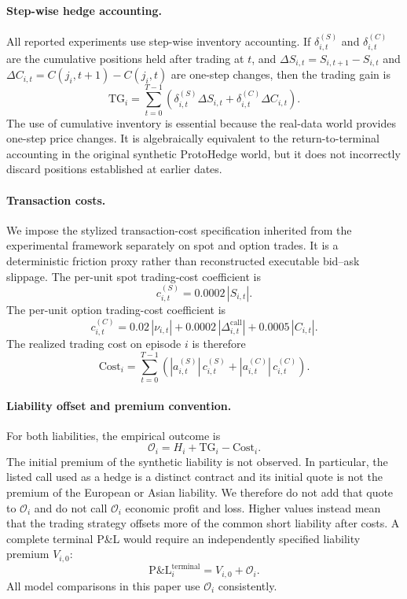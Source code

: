 \documentclass[sigconf]{acmart}
\begin{document}
\paragraph{Step-wise hedge accounting.}
All reported experiments use step-wise inventory accounting. If
$\delta_{i,t}^{(S)}$ and $\delta_{i,t}^{(C)}$ are the cumulative positions
held after trading at $t$, and $\Delta S_{i,t}=S_{i,t+1}-S_{i,t}$ and
$\Delta C_{i,t}=C(j_i,t+1)-C(j_i,t)$ are one-step changes, then the trading
gain is
\[
\mathrm{TG}_i
=
\sum_{t=0}^{T-1}
\left(
\delta_{i,t}^{(S)}\Delta S_{i,t}
+
\delta_{i,t}^{(C)}\Delta C_{i,t}
\right).
\]
The use of cumulative inventory is essential because the real-data world
provides one-step price changes. It is algebraically equivalent to the
return-to-terminal accounting in the original synthetic ProtoHedge world, but
it does not incorrectly discard positions established at earlier dates.

\paragraph{Transaction costs.}
We impose the stylized transaction-cost specification inherited from the
experimental framework separately on spot and option trades. It is a
deterministic friction proxy rather than reconstructed executable bid--ask
slippage. The per-unit spot trading-cost coefficient is
\[
c_{i,t}^{(S)} = 0.0002\,|S_{i,t}|.
\]
The per-unit option trading-cost coefficient is
\[
c_{i,t}^{(C)} = 0.02\,|\nu_{i,t}| + 0.0002\,|\Delta^{\mathrm{call}}_{i,t}| + 0.0005\,|C_{i,t}|.
\]
The realized trading cost on episode $i$ is therefore
\[
\mathrm{Cost}_i
=
\sum_{t=0}^{T-1}
\left(
|a_{i,t}^{(S)}|\,c_{i,t}^{(S)}
+
|a_{i,t}^{(C)}|\,c_{i,t}^{(C)}
\right).
\]

\paragraph{Liability offset and premium convention.}
For both liabilities, the empirical outcome is
\[
\mathcal{O}_i = H_i + \mathrm{TG}_i - \mathrm{Cost}_i.
\]
The initial premium of the synthetic liability is not observed. In
particular, the listed call used as a hedge is a distinct contract and its
initial quote is not the premium of the European or Asian liability. We
therefore do not add that quote to $\mathcal{O}_i$ and do not call
$\mathcal{O}_i$ economic profit and loss. Higher values instead mean that the
trading strategy offsets more of the common short liability after costs. A
complete terminal P\&L would require an independently specified liability
premium $V_{i,0}$:
\[
\mathrm{P\&L}^{\mathrm{terminal}}_i
=
V_{i,0}+\mathcal{O}_i.
\]
All model comparisons in this paper use $\mathcal{O}_i$ consistently.
\end{document}

